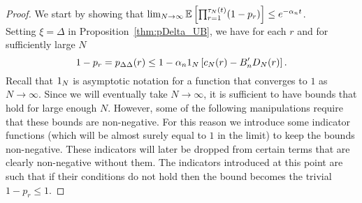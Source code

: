 \begin{proof}
We start by showing that
$\lim_{N\to\infty}\mathbb{E}\left[ \prod_{r=1}^{\tau_N(t)} (1-p_r) \right] 
\leq e^{-\alpha_n t}$.\\
Setting $\xi=\Delta$ in Proposition~\ref{thm:pDelta_UB}, we have for each $r$ and for sufficiently large $N$
\begin{equation} \label{eq:018}
1-p_r
= p_{\Delta\Delta}(r) 
\leq 1 - \alpha_n \ON %
        \left[ c_N(r) - B_n^\prime D_N(r) \right] .
\end{equation}
Recall that $1_N$ is asymptotic notation for a function that converges to $1$ as $N\to\infty$.
Since we will eventually take $N\to\infty$, it is sufficient to have bounds that hold for large enough $N$. However, some of the following manipulations require that these bounds are non-negative. For this reason we introduce some indicator functions (which will be almost surely equal to $1$ in the limit) to keep the bounds non-negative.
These indicators will later be dropped from certain terms that are clearly non-negative without them. 
The indicators introduced at this point are such that if their conditions do not hold then the bound becomes the trivial $1-p_r \leq 1$.
 

\end{proof}
